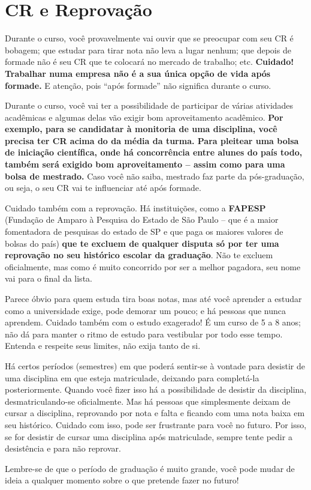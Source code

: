 \section{CR e Reprovação}

Durante o curso, você provavelmente vai ouvir que se preocupar com seu CR é  bobagem; que estudar para tirar nota não leva a lugar nenhum; que depois de formade  não é seu CR que te colocará no mercado de trabalho; etc. \textbf{Cuidado! Trabalhar numa  empresa não é a sua única opção de vida após formade.} E atenção, pois “após formade”  não significa durante o curso. 

Durante o curso, você vai ter a possibilidade de participar de várias atividades  acadêmicas e algumas delas vão exigir bom aproveitamento acadêmico. \textbf{Por exemplo, para se candidatar à monitoria de uma disciplina, você precisa ter CR acima do da média  da turma. Para pleitear uma bolsa de iniciação científica, onde há concorrência entre alunes do país todo, também será exigido bom aproveitamento – assim como para uma  bolsa de mestrado.} Caso você não saiba, mestrado faz parte da pós-graduação, ou seja, o  seu CR vai te influenciar até após formade. 

Cuidado também com a reprovação. Há instituições, como a \textbf{FAPESP} (Fundação de  Amparo à Pesquisa do Estado de São Paulo – que é a maior fomentadora de pesquisas  do estado de SP e que paga os maiores valores de bolsas do país) \textbf{que te excluem de  qualquer disputa só por ter uma reprovação no seu histórico escolar da graduação}. Não  te excluem oficialmente, mas como é muito concorrido por ser a melhor pagadora, seu  nome vai para o final da lista. 

Parece óbvio para quem estuda tira boas notas, mas até você aprender a estudar  como a universidade exige, pode demorar um pouco; e há pessoas que nunca aprendem.  Cuidado também com o estudo exagerado! É um curso de 5 a 8 anos; não dá para  manter o ritmo de estudo para vestibular por todo esse tempo. Entenda e respeite seus  limites, não exija tanto de si.  

Há certos períodos (semestres) em que poderá sentir-se à vontade para desistir de  uma disciplina em que esteja matriculade, deixando para completá-la posteriormente.  Quando você fizer isso há a possibilidade de desistir da disciplina, desmatriculando-se  oficialmente. Mas há pessoas que simplesmente deixam de cursar a disciplina,  reprovando por nota e falta e ficando com uma nota baixa em seu histórico. Cuidado  com isso, pode ser frustrante para você no futuro. Por isso, se for desistir de cursar uma  disciplina após matriculade, sempre tente pedir a desistência e para não reprovar. 

Lembre-se de que o período de graduação é muito grande, você pode mudar de  ideia a qualquer momento sobre o que pretende fazer no futuro!
